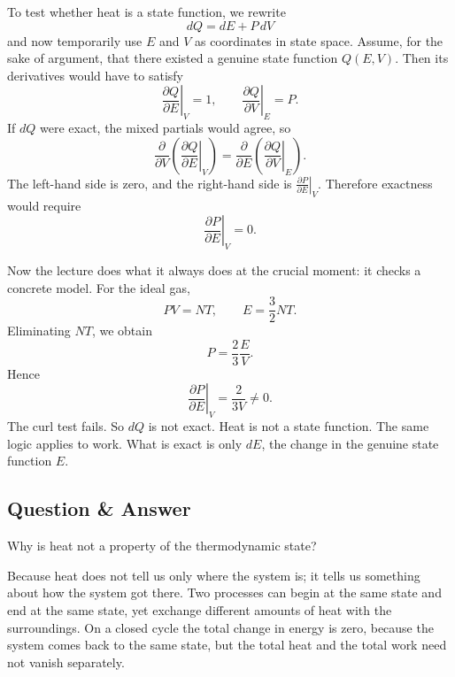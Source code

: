 To test whether heat is a state function, we rewrite
\begin{equation}
dQ=dE+P\,dV
\end{equation}
and now temporarily use \(E\) and \(V\) as coordinates in state space. Assume, for the sake of argument, that there existed a genuine state function \(Q(E,V)\). Then its derivatives would have to satisfy
\begin{equation}
\left.\frac{\partial Q}{\partial E}\right|_V=1,
\qquad
\left.\frac{\partial Q}{\partial V}\right|_E=P.
\end{equation}
If \(dQ\) were exact, the mixed partials would agree, so
\begin{equation}
\frac{\partial}{\partial V}\left(\left.\frac{\partial Q}{\partial E}\right|_V\right)
=
\frac{\partial}{\partial E}\left(\left.\frac{\partial Q}{\partial V}\right|_E\right).
\end{equation}
The left-hand side is zero, and the right-hand side is \(\left.\frac{\partial P}{\partial E}\right|_V\). Therefore exactness would require
\begin{equation}
\left.\frac{\partial P}{\partial E}\right|_V=0.
\end{equation}

Now the lecture does what it always does at the crucial moment: it checks a concrete model. For the ideal gas,
\begin{equation}
PV=NT,
\qquad
E=\frac{3}{2}NT.
\end{equation}
Eliminating \(NT\), we obtain
\begin{equation}
P=\frac{2}{3}\frac{E}{V}.
\end{equation}
Hence
\begin{equation}
\left.\frac{\partial P}{\partial E}\right|_V=\frac{2}{3V}\neq 0.
\end{equation}
The curl test fails. So \(dQ\) is not exact. Heat is not a state function. The same logic applies to work. What is exact is only \(dE\), the change in the genuine state function \(E\).

\subsection{Question \& Answer}

Why is heat not a property of the thermodynamic state?

Because heat does not tell us only where the system is; it tells us something about how the system got there. Two processes can begin at the same state and end at the same state, yet exchange different amounts of heat with the surroundings. On a closed cycle the total change in energy is zero, because the system comes back to the same state, but the total heat and the total work need not vanish separately.

